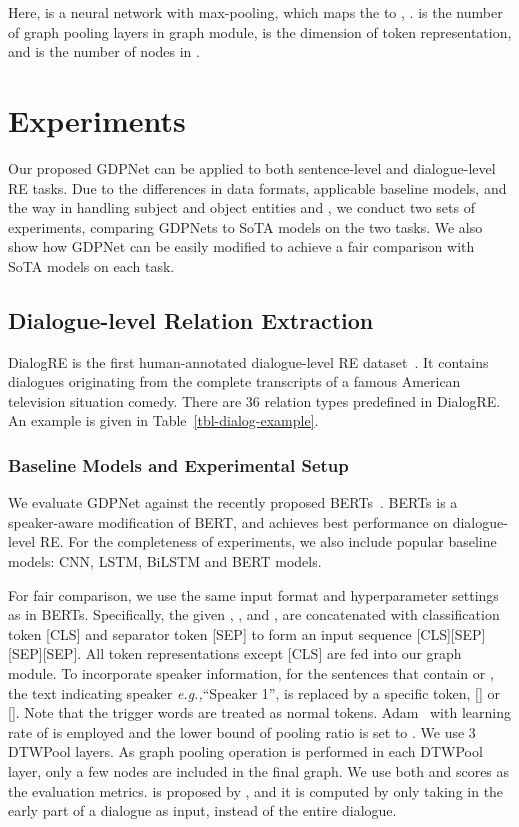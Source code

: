 \documentclass[letterpaper]{article} \usepackage{aaai21}  \usepackage{times}  \usepackage{helvet} \usepackage{courier}  \usepackage[hyphens]{url}  \usepackage{graphicx} \urlstyle{rm} \def\UrlFont{\rm}  \usepackage{graphicx}  \usepackage{natbib}  \usepackage{caption}
\newcommand{\eg}{\emph{e.g.,}\xspace}
\begin{document}
Here,  is a neural network with max-pooling, which maps the  to , .  is the number of graph pooling layers in graph module,  is the dimension of token representation, and  is the number of nodes in .






\section{Experiments}
Our proposed GDPNet can be applied to both sentence-level and dialogue-level RE tasks. Due to the differences in data formats, applicable baseline models, and the way in handling subject and object entities  and , we conduct two sets of experiments, comparing GDPNets to SoTA models on the two tasks. We also show how GDPNet can be easily modified to achieve a fair comparison with SoTA models on each task.   

\subsection{Dialogue-level Relation Extraction}


DialogRE is the first human-annotated dialogue-level RE dataset~\cite{yu-etal-2020-dialogue}. It contains  dialogues originating from the complete transcripts of a famous American television situation comedy. There are 36 relation types predefined in DialogRE. An example is given in Table~\ref{tbl-dialog-example}. 

\subsubsection{Baseline Models and Experimental Setup}
We evaluate GDPNet against the recently proposed BERTs~\cite{yu-etal-2020-dialogue}. BERTs is a speaker-aware modification of BERT, and achieves best performance on dialogue-level RE. For the completeness of experiments, we also include popular baseline models: CNN, LSTM, BiLSTM and BERT models.

For fair comparison, we use the same input format and hyperparameter settings as in BERTs. Specifically, the given , , and , are concatenated with classification token [CLS] and separator token [SEP] to form an input sequence [CLS][SEP][SEP][SEP]. All token representations except [CLS] are fed into our graph module. To incorporate speaker information, for the sentences that contain  or , the text indicating speaker \eg ``Speaker 1'', is replaced by a specific token, [] or []. Note that the trigger words are treated as normal tokens. Adam~\cite{Kingma2015AdamAM} with learning rate of  is employed and the lower bound of pooling ratio is set to . We use 3 DTWPool layers. As graph pooling operation is performed in each DTWPool layer, only a few nodes are included in the final graph. We use both  and  scores as the evaluation metrics.  is proposed by \citet{yu-etal-2020-dialogue}, and it is computed by only taking in the early part of a dialogue as input, instead of the entire dialogue.
\end{document}
